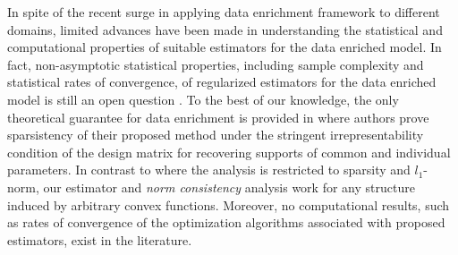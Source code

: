 In spite of the recent surge in applying data enrichment framework to different domains, limited advances have been made in
understanding the statistical and computational properties of suitable estimators for the data enriched model.
In fact, non-asymptotic statistical properties, including sample complexity and statistical rates of convergence, of regularized estimators for the data enriched model is still an open question \cite{grti16, olvi14}.
To the best of our knowledge, the only theoretical guarantee for data enrichment is provided in \cite{olvi15} where authors prove sparsistency of their proposed method under the stringent irrepresentability condition of the design matrix for recovering supports of common and individual parameters.
In contrast to \cite{olvi15} where the analysis is restricted to sparsity and $l_1$-norm, our estimator and \emph{norm consistency} analysis work for any structure induced by arbitrary convex functions. %
Moreover, no computational results, such as rates of convergence of the optimization algorithms associated with proposed estimators, exist in the literature.

%

